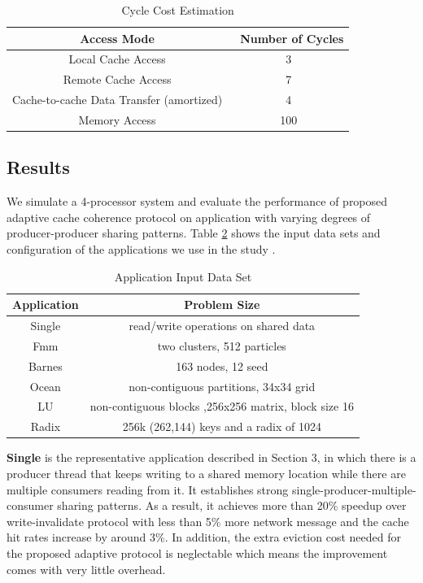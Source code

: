 \documentclass[11pt,conference]{IEEEtran}
\begin{document}
\begin{table}[!h]
\renewcommand{\arraystretch}{2.5}
\caption{Cycle Cost Estimation}
\label{cost_estimation}
\centering
\begin{tabular}{|c|c|}
\hline
Access Mode & \ Number of Cycles\\
\hline
Local Cache Access & 3\\
\hline
Remote Cache Access & 7\\
\hline
Cache-to-cache Data Transfer (amortized) & 4\\
\hline
Memory Access & 100\\
\hline
\end{tabular}
\end{table}
\FloatBarrier

\subsection{Results}
We simulate a 4-processor system and evaluate the performance of proposed adaptive cache coherence protocol on application with varying degrees of producer-producer sharing patterns. Table \ref{app} shows the input data sets and configuration of the applications we use in the study \cite{splash}.

\begin{table}[!h]
\renewcommand{\arraystretch}{2.5}
\caption{Application Input Data Set}
\label{app}
\centering
\begin{tabular}{|c|c|}
\hline
Application & Problem Size\\
\hline
Single & read/write operations on shared data\\
\hline
Fmm & two clusters, 512 particles\\
\hline
Barnes & 163 nodes, 12 seed\\
\hline
Ocean & non-contiguous partitions, 34x34 grid\\
\hline
LU & non-contiguous blocks ,256x256 matrix, block size 16\\
\hline
Radix & 256k (262,144) keys and a radix of 1024\\
\hline
\end{tabular}
\end{table}
\FloatBarrier

\textbf{Single} is the representative application described in Section 3, in which there is a producer thread that keeps writing to a shared memory location while there are multiple consumers reading from it. It establishes strong single-producer-multiple-consumer sharing patterns. As a result, it achieves more than 20\% speedup over write-invalidate protocol with less than 5\% more network message and the cache hit rates increase by around 3\%. In addition, the extra eviction cost needed for the proposed adaptive protocol is neglectable which means the improvement comes with very little overhead.
\end{document}

